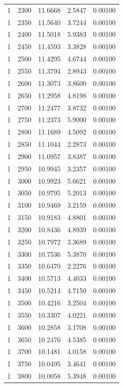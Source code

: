\begin{longtable}{ccccc}
    1 & 2300 & 11.6668 & 2.5847 & 0.00100 \\
    1 & 2350 & 11.5640 & 3.7244 & 0.00100 \\
    1 & 2400 & 11.5018 & 5.9383 & 0.00100 \\
    1 & 2450 & 11.4593 & 3.3828 & 0.00100 \\
    1 & 2500 & 11.4295 & 4.6744 & 0.00100 \\
    1 & 2550 & 11.3794 & 2.8943 & 0.00100 \\
    1 & 2600 & 11.3073 & 3.8600 & 0.00100 \\
    1 & 2650 & 11.2958 & 4.8198 & 0.00100 \\
    1 & 2700 & 11.2477 & 3.8732 & 0.00100 \\
    1 & 2750 & 11.2373 & 5.9000 & 0.00100 \\
    1 & 2800 & 11.1689 & 4.5092 & 0.00100 \\
    1 & 2850 & 11.1044 & 2.2873 & 0.00100 \\
    1 & 2900 & 11.0957 & 3.8387 & 0.00100 \\
    1 & 2950 & 10.9945 & 3.2357 & 0.00100 \\
    1 & 3000 & 10.9923 & 5.6621 & 0.00100 \\
    1 & 3050 & 10.9795 & 5.2013 & 0.00100 \\
    1 & 3100 & 10.9469 & 3.2159 & 0.00100 \\
    1 & 3150 & 10.9183 & 4.8801 & 0.00100 \\
    1 & 3200 & 10.8436 & 4.8939 & 0.00100 \\
    1 & 3250 & 10.7972 & 3.3689 & 0.00100 \\
    1 & 3300 & 10.7536 & 5.3870 & 0.00100 \\
    1 & 3350 & 10.6470 & 2.2276 & 0.00100 \\
    1 & 3400 & 10.5713 & 4.4033 & 0.00100 \\
    1 & 3450 & 10.5214 & 4.7150 & 0.00100 \\
    1 & 3500 & 10.4216 & 3.2504 & 0.00100 \\
    1 & 3550 & 10.3307 & 4.0221 & 0.00100 \\
    1 & 3600 & 10.2858 & 3.1708 & 0.00100 \\
    1 & 3650 & 10.2476 & 4.5385 & 0.00100 \\
    1 & 3700 & 10.1481 & 4.0158 & 0.00100 \\
    1 & 3750 & 10.0495 & 3.4641 & 0.00100 \\
    1 & 3800 & 10.0058 & 5.3948 & 0.00100 \\

\end{longtable}
